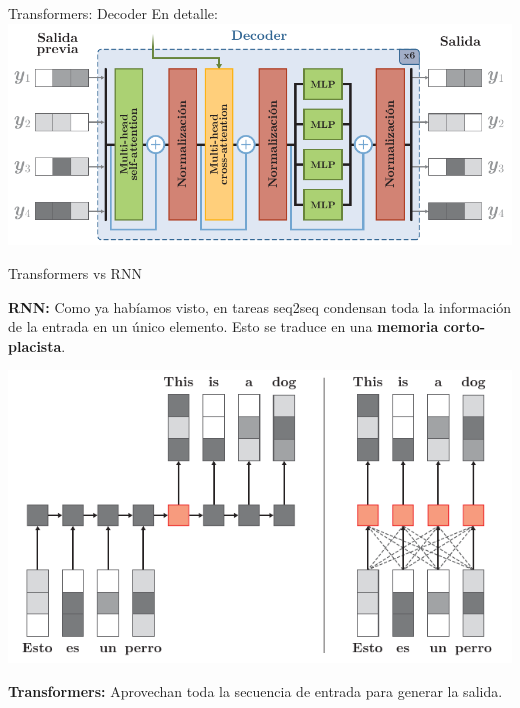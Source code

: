 \documentclass[aspectratio=169]{beamer}
\begin{document}
\begin{frame}{Transformers: Decoder}
  En detalle:\\
  \vspace{.5cm}
  \includegraphics[width=.85\textwidth, center]{imgs/tema4/att/Transformer_dec.pdf}
\end{frame}

\begin{frame}{Transformers vs RNN}
  \begin{block}{}
    \textbf{RNN:} Como ya habíamos visto, en tareas seq2seq condensan toda la información de la entrada en un único elemento. Esto se traduce en una \textbf{memoria corto-placista}.
  \end{block}
  \includegraphics[width=.55\textwidth, center]{imgs/tema4/att/ATT_vs_RNN.pdf}
  
  \begin{block}{}
    \textbf{Transformers:} Aprovechan toda la secuencia de entrada para generar la salida.
  \end{block}

\end{frame}
\end{document}
